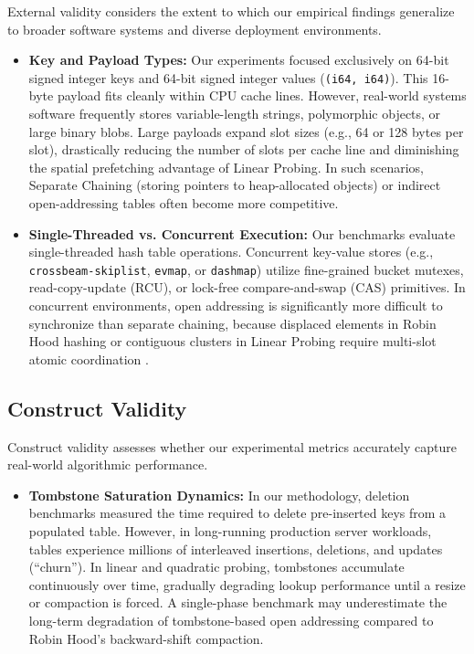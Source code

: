\documentclass[conference]{IEEEtran}
\begin{document}
External validity considers the extent to which our empirical findings generalize to broader software systems and diverse deployment environments.
\begin{itemize}
  \item \textbf{Key and Payload Types:} Our experiments focused exclusively on 64-bit signed integer keys and 64-bit signed integer values (\texttt{(i64, i64)}). This 16-byte payload fits cleanly within CPU cache lines. However, real-world systems software frequently stores variable-length strings, polymorphic objects, or large binary blobs. Large payloads expand slot sizes (e.g., 64 or 128 bytes per slot), drastically reducing the number of slots per cache line and diminishing the spatial prefetching advantage of Linear Probing. In such scenarios, Separate Chaining (storing pointers to heap-allocated objects) or indirect open-addressing tables often become more competitive.
  \item \textbf{Single-Threaded vs. Concurrent Execution:} Our benchmarks evaluate single-threaded hash table operations. Concurrent key-value stores (e.g., \texttt{crossbeam-skiplist}, \texttt{evmap}, or \texttt{dashmap}) utilize fine-grained bucket mutexes, read-copy-update (RCU), or lock-free compare-and-swap (CAS) primitives. In concurrent environments, open addressing is significantly more difficult to synchronize than separate chaining, because displaced elements in Robin Hood hashing or contiguous clusters in Linear Probing require multi-slot atomic coordination \cite{maier2019}.
\end{itemize}

\subsection{Construct Validity}

Construct validity assesses whether our experimental metrics accurately capture real-world algorithmic performance.
\begin{itemize}
  \item \textbf{Tombstone Saturation Dynamics:} In our methodology, deletion benchmarks measured the time required to delete pre-inserted keys from a populated table. However, in long-running production server workloads, tables experience millions of interleaved insertions, deletions, and updates (``churn''). In linear and quadratic probing, tombstones accumulate continuously over time, gradually degrading lookup performance until a resize or compaction is forced. A single-phase benchmark may underestimate the long-term degradation of tombstone-based open addressing compared to Robin Hood's backward-shift compaction.
\end{itemize}
\end{document}
